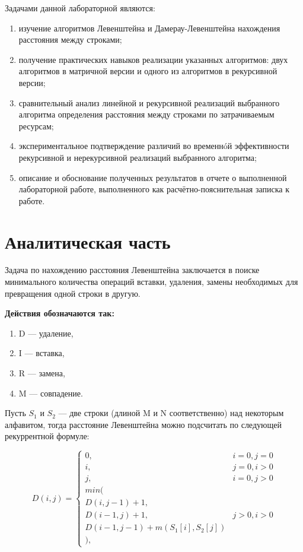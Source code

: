 \documentclass[12pt]{report}
\begin{document}
Задачами данной лабораторной являются:
\begin{enumerate}
  	\item изучение алгоритмов Левенштейна и Дамерау-Левенштейна нахождения расстояния между строками;
	\item получение практических навыков реализации указанных алгоритмов: двух алгоритмов в матричной версии и одного из алгоритмов в рекурсивной версии; 
	\item сравнительный анализ линейной и рекурсивной реализаций выбранного алгоритма определения расстояния между строками по затрачиваемым ресурсам; 
	\item экспериментальное подтверждение различий во временнóй эффективности рекурсивной и
нерекурсивной реализаций выбранного алгоритма; 
	\item описание и обоснование полученных результатов в отчете о выполненной лабораторной
работе, выполненного как расчётно-пояснительная записка к работе. 
\end{enumerate}


\chapter{Аналитическая часть}
Задача по нахождению расстояния Левенштейна заключается в поиске минимального количества операций вставки, удаления, замены необходимых для превращения одной строки в другую.
 
\textbf{Действия обозначаются так:} 
\begin{enumerate}
  	\item D — удаление,
	\item I  — вставка,
	\item R  — замена,
	\item M — совпадение.
\end{enumerate}

Пусть $S_{1}$ и $S_{2}$ — две строки (длиной M и N соответственно) над некоторым алфавитом, тогда расстояние Левенштейна можно подсчитать по следующей рекуррентной формуле:

\begin{displaymath}
D(i,j) = \left\{ \begin{array}{ll}
 0, & \textrm{$i = 0, j = 0$}\\
 i, & \textrm{$j = 0, i > 0$}\\
 j, & \textrm{$i = 0, j > 0$}\\
min(\\
D(i,j-1)+1,\\
D(i-1, j) +1, &\textrm{$j>0, i>0$}\\
D(i-1, j-1) + m(S_{1}[i], S_{2}[j])\\
),
  \end{array} \right.
\end{displaymath}
\end{document}
